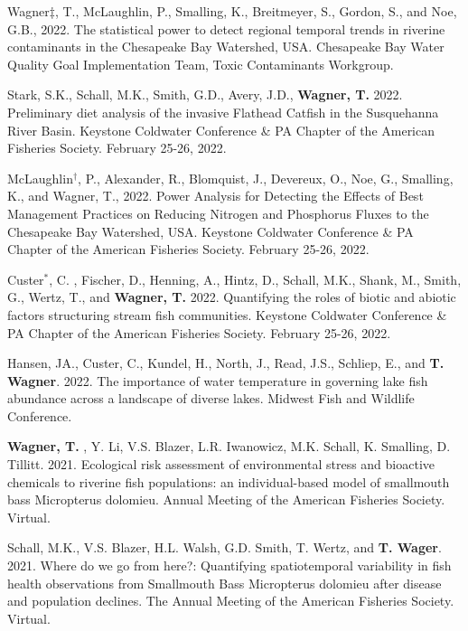 \documentclass[10pt]{article}
\begin{document}
\begin{flushleft}
\begin{etaremune}
\item Wagner$\ddagger$, T., McLaughlin, P., Smalling, K., Breitmeyer, S., Gordon, S., and Noe, G.B., 2022. The statistical power to detect regional temporal trends in riverine contaminants in the Chesapeake Bay Watershed, USA. Chesapeake Bay Water Quality Goal Implementation Team, Toxic Contaminants Workgroup.

\item Stark, S.K., Schall, M.K., Smith, G.D., Avery, J.D., \textbf{Wagner, T.} 2022. Preliminary diet analysis of the invasive Flathead Catfish in the Susquehanna River Basin. Keystone Coldwater Conference \& PA Chapter of the American Fisheries Society. February 25-26, 2022.

\item McLaughlin$^\dagger$, P., Alexander, R., Blomquist, J., Devereux, O., Noe, G., Smalling, K., and Wagner, T., 2022. Power Analysis for Detecting the Effects of Best Management Practices on Reducing Nitrogen and Phosphorus Fluxes to the Chesapeake Bay Watershed, USA. Keystone Coldwater Conference \& PA Chapter of the American Fisheries Society. February 25-26, 2022.

\item Custer$^*$, C. , Fischer, D., Henning, A., Hintz, D., Schall, M.K., Shank, M., Smith, G., Wertz, T., and \textbf{Wagner, T.} 2022. Quantifying the roles of biotic and abiotic factors structuring stream fish communities. Keystone Coldwater Conference \& PA Chapter of the American Fisheries Society. February 25-26, 2022.

\item Hansen, JA., Custer, C., Kundel, H., North, J., Read, J.S., Schliep, E., and \textbf{T. Wagner}. 2022. The importance of water temperature in governing lake fish abundance across a landscape of diverse lakes. Midwest Fish and Wildlife Conference. 

\item \textbf{Wagner, T. }, Y. Li, V.S. Blazer, L.R. Iwanowicz, M.K. Schall, K. Smalling, D. Tillitt. 2021. Ecological risk assessment of environmental stress and bioactive chemicals to riverine fish populations: an individual-based model of smallmouth bass Micropterus dolomieu. Annual Meeting of the American Fisheries Society. Virtual.

\item Schall, M.K., V.S. Blazer, H.L. Walsh, G.D. Smith, T. Wertz, and \textbf{T. Wager}. 2021. Where do we go from here?: Quantifying spatiotemporal variability in fish health observations from Smallmouth Bass Micropterus dolomieu after disease and population declines. The Annual Meeting of the American Fisheries Society. Virtual.


\end{etaremune}
\end{flushleft}
\end{document}
